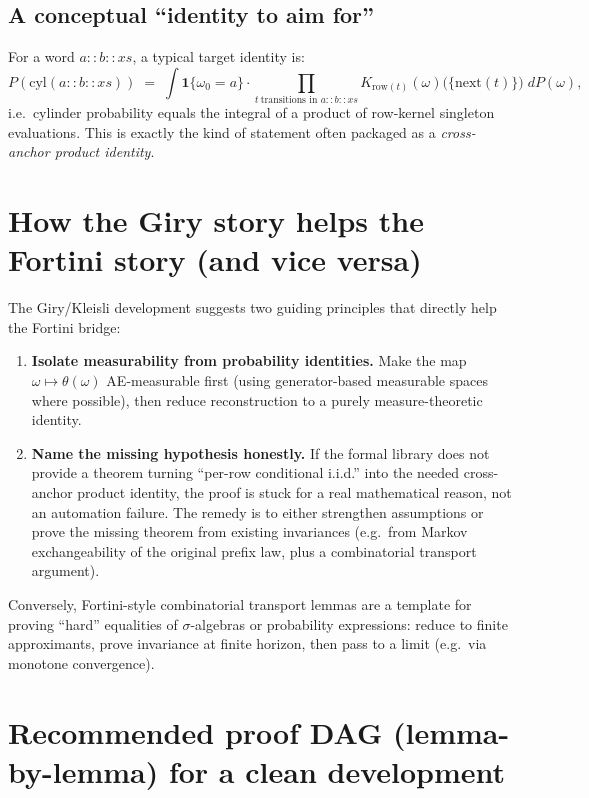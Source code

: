 \documentclass[11pt]{article}
\begin{document}
\subsection{A conceptual ``identity to aim for''}

For a word $a::b::xs$, a typical target identity is:
\[
P(\mathrm{cyl}(a::b::xs)) \;=\; \int \mathbf{1}\{ \omega_0=a\}\cdot
\prod_{t\ \text{transitions in }a::b::xs} K_{\text{row}(t)}(\omega)\big(\{\text{next}(t)\}\big)\; dP(\omega),
\]
i.e.\ cylinder probability equals the integral of a product of row-kernel singleton evaluations.
This is exactly the kind of statement often packaged as a \emph{cross-anchor product identity}.

\section{How the Giry story helps the Fortini story (and vice versa)}

The Giry/Kleisli development suggests two guiding principles that directly help the Fortini bridge:

\begin{enumerate}[label=\arabic*.]
\item \textbf{Isolate measurability from probability identities.}
Make the map $\omega \mapsto \theta(\omega)$ AE-measurable first (using generator-based
measurable spaces where possible), then reduce reconstruction to a purely measure-theoretic identity.

\item \textbf{Name the missing hypothesis honestly.}
If the formal library does not provide a theorem turning ``per-row conditional i.i.d.'' into the
needed cross-anchor product identity, the proof is stuck for a real mathematical reason, not an
automation failure. The remedy is to either strengthen assumptions or prove the missing theorem from
existing invariances (e.g.\ from Markov exchangeability of the original prefix law, plus a combinatorial
transport argument).
\end{enumerate}

Conversely, Fortini-style combinatorial transport lemmas are a template for proving ``hard'' equalities
of $\sigma$-algebras or probability expressions: reduce to finite approximants, prove invariance at
finite horizon, then pass to a limit (e.g.\ via monotone convergence).

\section{Recommended proof DAG (lemma-by-lemma) for a clean development}
\end{document}
